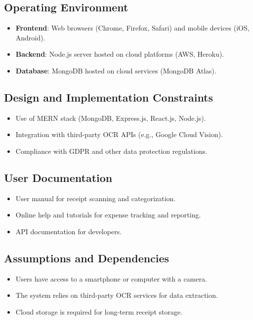 \documentclass[12pt]{article}
\begin{document}
\subsection{Operating Environment}
\begin{itemize}
    \item \textbf{Frontend}: Web browsers (Chrome, Firefox, Safari) and mobile devices (iOS, Android).
    \item \textbf{Backend}: Node.js server hosted on cloud platforms (AWS, Heroku).
    \item \textbf{Database}: MongoDB hosted on cloud services (MongoDB Atlas).
\end{itemize}

\subsection{Design and Implementation Constraints}
\begin{itemize}
    \item Use of MERN stack (MongoDB, Express.js, React.js, Node.js).
    \item Integration with third-party OCR APIs (e.g., Google Cloud Vision).
    \item Compliance with GDPR and other data protection regulations.
\end{itemize}

\subsection{User Documentation}
\begin{itemize}
    \item User manual for receipt scanning and categorization.
    \item Online help and tutorials for expense tracking and reporting.
    \item API documentation for developers.
\end{itemize}

\subsection{Assumptions and Dependencies}
\begin{itemize}
    \item Users have access to a smartphone or computer with a camera.
    \item The system relies on third-party OCR services for data extraction.
    \item Cloud storage is required for long-term receipt storage.
\end{itemize}
\end{document}
